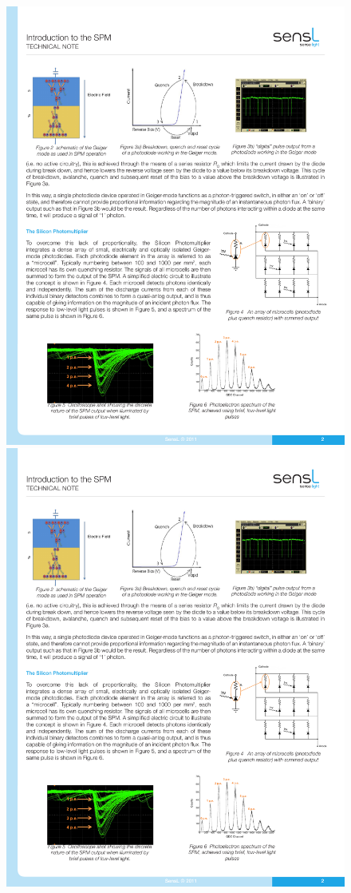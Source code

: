 \begin{figure}[!bhtp]
	\centering
	\includegraphics[scale=1.1]{img/SiPMCircuit.pdf}
	\includegraphics[scale=1.1]{img/PhotoelectronSpectrum.pdf}

\end{figure}
